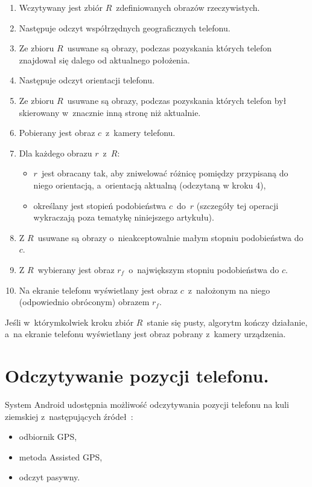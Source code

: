 \documentclass[a4paper,twocolumn,11pt]{article}
\begin{document}
\begin{enumerate}
 \item Wczytywany jest zbiór $R$~zdefiniowanych obrazów rzeczywistych.
 \item Następuje odczyt współrzędnych geograficznych telefonu.
 \item Ze zbioru $R$~usuwane są obrazy, podczas pozyskania których telefon znajdował się dalego od aktualnego położenia.
 \item Następuje odczyt orientacji telefonu.
 \item Ze zbioru $R$~usuwane są obrazy, podczas pozyskania których telefon był skierowany w~znacznie inną stronę niż aktualnie.
 \item Pobierany jest obraz $c$~z~kamery telefonu.
 \item Dla każdego obrazu $r$~z~$R$:
  \begin{itemize}
   \item $r$~jest obracany tak, aby zniwelować różnicę pomiędzy przypisaną do niego orientacją, a~orientacją aktualną (odczytaną w kroku 4),
   \item określany jest stopień podobieństwa $c$~do~$r$ (szczegóły tej operacji wykraczają poza tematykę niniejszego artykułu).
  \end{itemize}
 \item Z $R$~usuwane są obrazy o~nieakceptowalnie małym stopniu podobieństwa do $c$.
 \item Z $R$~wybierany jest obraz $r_f$~o~największym stopniu podobieństwa do $c$.
 \item Na ekranie telefonu wyświetlany jest obraz $c$~z~nałożonym na niego (odpowiednio obróconym) obrazem $r_f$.
\end{enumerate}

Jeśli w~którymkolwiek kroku zbiór $R$~stanie się pusty, algorytm kończy działanie, a~na ekranie telefonu wyświetlany jest obraz pobrany z~kamery urządzenia.




\section{Odczytywanie pozycji telefonu.} \label{sec:position_tracking}

System Android udostępnia możliwość odczytywania pozycji telefonu na kuli ziemskiej z~następujących źródeł~\cite{and:loc}:

\begin{itemize}
 \item odbiornik GPS,
 \item metoda Assisted GPS,
 \item odczyt pasywny.
\end{itemize}
\end{document}
